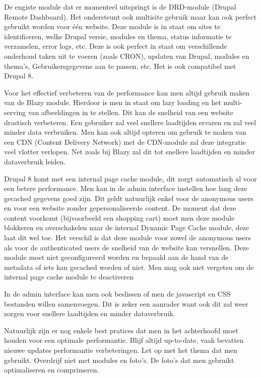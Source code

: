 De engiste module dat er momenteel uitspringt is de DRD-module (Drupal Remote Dashboard). Het ondersteunt ook multisite gebruik maar kan ook perfect gebruikt worden voor één website. Deze module is in staat om sites te identificeren, welke Drupal versie, modules en thema, status informatie te verzamelen, error logs, etc. Deze is ook perfect in staat om verschillende onderhoud taken uit te voeren (zoals CRON), updaten van Drupal, modules en thema's, Gebruikersgegevens aan te passen, etc. Het is ook compatibel met Drupal 8. 

Voor het effectief verbeteren van de performance kan men altijd gebruik maken van de Blazy module. Hierdoor is men in staat om lazy loading en het multi-serving van afbeeldingen in te stellen. Dit kan de snelheid van een website drastisch verbeteren. Een gebruiker zal veel snellere laadtijden ervaren en zal veel minder data verbruiken. Men kan ook altijd opteren om gebruik te maken van een CDN (Content Delivery Network) met de CDN-module zal deze integratie veel vlotter verlopen. Net zoals bij Blazy zal dit tot snellere laadtijden en minder dataverbruik leiden.

Drupal 8 komt met een internal page cache module, dit zorgt automatisch al voor een betere performance. Men kan in de admin interface instellen hoe lang deze gecached gegevens goed zijn. Dit geldt natuurlijk enkel voor de anonymous users en voor een website zonder gepersonaliseerde content. De moment dat deze content voorkomt (bijvoorbeeld een shopping cart) moet men deze module blokkeren en overschakelen naar de internal Dynamic Page Cache module, deze laat dit wel toe. Het verschil is dat deze module voor zowel de anonymous users als voor de authenticated users de snelheid van de website kan versnellen. Deze module moet niet geconfigureerd worden en bepaald aan de hand van de metadata of iets kan gecached worden of niet. Men mag ook niet vergeten om de internal page cache module te deactiveren

In de admin interface kan men ook beslissen of men de javascript en CSS bestanden willen samenvoegen. Dit is zeker een aanrader want ook dit zal weer zorgen voor snellere laadtijden en minder dataverbruik.

Natuurlijk zijn er nog enkele best pratices dat men in het achterhoofd moet houden voor een optimale performantie. Blijf altijd up-to-date, vaak bevatten nieuwe updates performantie verbeteringen. Let op met het thema dat men gebruikt. Overdrijf niet met modules en foto's. De foto's dat men gebruikt optimaliseren en comprimeren.

